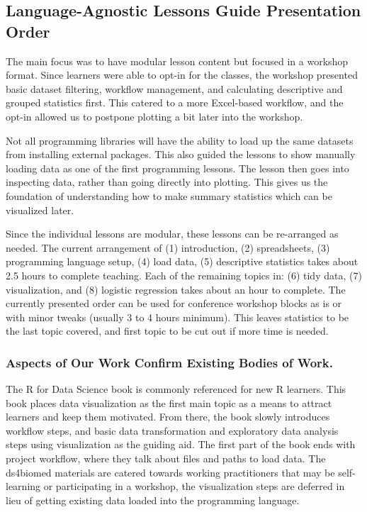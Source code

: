 \documentclass[030-workshop.tex]{subfiles}
\begin{document}
    \subsection{Language-Agnostic Lessons Guide Presentation Order}

        The main focus was to have modular lesson content but focused in a workshop format.
        Since learners were able to opt-in for the classes,
        the workshop presented basic dataset filtering, workflow management, and calculating descriptive and grouped statistics first.
        This catered to a more Excel-based workflow,
        and the opt-in allowed us to postpone plotting a bit later into the workshop.

        Not all programming libraries will have the ability to load up the same datasets from installing external packages.
        This also guided the lessons to show manually loading data as one of the first programming lessons.
        The lesson then goes into inspecting data, rather than going directly into plotting.
        This gives us the foundation of understanding how to make summary statistics which can be visualized later.

        Since the individual lessons are modular, these lessons can be re-arranged as needed.
        The current arrangement of
        (1) introduction,
        (2) spreadsheets,
        (3) programming language setup,
        (4) load data,
        (5) descriptive statistics
        takes about 2.5 hours to complete teaching.
        Each of the remaining topics in:
        (6) tidy data,
        (7) visualization, and
        (8) logistic regression
        takes about an hour to complete.
        The currently presented order can be used for conference workshop blocks as is or with minor tweaks (usually 3 to 4 hours minimum).
        This leaves statistics to be the last topic covered, and first topic to be cut out if more time is needed.

        \subsubsection{Aspects of Our Work Confirm Existing Bodies of Work.}

            The R for Data Science book is commonly referenced for new R learners.
            This book places data visualization as the first main topic as a means to attract learners and keep them motivated.
            From there, the book slowly introduces workflow steps, and basic data transformation and exploratory data analysis
            steps using visualization as the guiding aid.
            The first part of the book ends with project workflow, where they talk about files and paths to load data.
            The ds4biomed materials are catered towards working practitioners that may be self-learning or participating in a workshop,
            the visualization steps are deferred in lieu of getting existing data loaded into the programming language.
\end{document}
